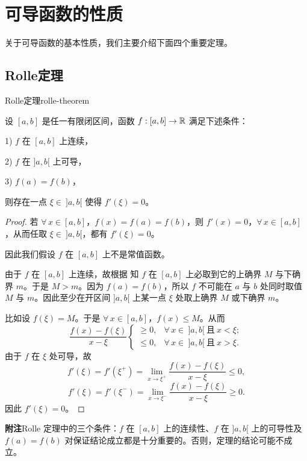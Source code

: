 \section{可导函数的性质}

关于可导函数的基本性质，我们主要介绍下面四个重要定理。

\subsection{Rolle定理}
	\label{sec:6-3-1}

\begin{mythm}{Rolle定理}{rolle-theorem}

	设 \([a,b]\) 是任一有限闭区间，函数 \(f:[a,b]\to\mathbb{R}\) 满足下述条件：

	1) \(f\) 在 \([a,b]\) 上连续，

	2) \(f\) 在 \(]a,b[\) 上可导，

	3) \(f(a)=f(b)\)，

	则存在一点 \(\xi\in\ ]a,b[\) 使得 \(f'(\xi)=0\)。

\end{mythm}

\begin{proof}

	若 \(\forall\,x\in[a,b]\)，\(f(x)=f(a)=f(b)\)，则 \(f'(x)=0\)，\(\forall\,x\in[a,b]\)，从而任取 \(\xi\in\ ]a,b[\)，都有 \(f'(\xi)=0\)。

	因此我们假设 \(f\) 在 \([a,b]\) 上不是常值函数。

	由于 \(f\) 在 \([a,b]\) 上连续，故根据 知 \(f\) 在 \([a,b]\) 上必取到它的上确界 \(M\) 与下确界 \(m\)。于是 \(M>m\)。因为 \(f(a)=f(b)\)，所以 \(f\) 不可能在 \(a\) 与 \(b\) 处同时取值 \(M\) 与 \(m\)。因此至少在开区间 \(]a,b[\) 上某一点 \(\xi\) 处取上确界 \(M\) 或下确界 \(m\)。

	比如设 \(f(\xi)=M\)。于是 \(\forall\,x\in[a,b]\)，\(f(x)\le M\)。从而
	\[
	\frac{f(x)-f(\xi)}{x-\xi}\begin{cases} \ge0, & \forall\,x\in\ ]a,b[\ \text{且}\ x<\xi; \\ \le0, & \forall\,x\in\ ]a,b[\ \text{且}\ x>\xi. \end{cases}
	\]
	由于 \(f\) 在 \(\xi\) 处可导，故
	\[
	f'(\xi)=f'(\xi^+)=\lim_{x\to\xi^+}\frac{f(x)-f(\xi)}{x-\xi}\le0,
	\]
	\[
	f'(\xi)=f'(\xi^-)=\lim_{x\to\xi^-}\frac{f(x)-f(\xi)}{x-\xi}\ge0.
	\]
	因此 \(f'(\xi)=0\)。

\end{proof}

\textbf{附注}\quad Rolle 定理中的三个条件：\(f\) 在 \([a,b]\) 上的连续性、\(f\) 在 \(]a,b[\) 上的可导性及 \(f(a)=f(b)\) 对保证结论成立都是十分重要的。否则，定理的结论可能不成立。

